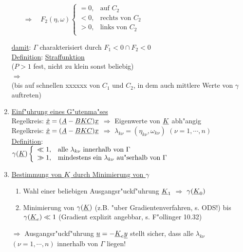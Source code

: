 \documentclass[openany,a4paper,11pt]{book}
\begin{document}
\begin{enumerate}
\begin{itemize}
        $\Rightarrow\quad F_2(\eta,\omega) \left \{%
        \begin{array}{ll}
          =0, & \text{auf } C_2\\
          <0, & \text{rechts von } C_2\\
          >0, & \text{links von } C_2\\
        \end{array} \right.$
    \end{itemize}
    \uline{damit}: $\Gamma$ charakterisiert durch $F_1<0 \cap F_2<0$\\
    \uline{Definition}: \uline{Straffunktion}\\ [3pt]
     \quad ($P>1$ fest, nicht zu klein sonst beliebig)\\
    $\Rightarrow$ \\
    (bis auf schnellen xxxxxx von $C_1$ und $C_2$, in dem auch mittlere Werte von $\gamma$ auftreten)
    \item \uline{Einf"uhrung eines G"utenma"ses}\\
    Regelkreis: $\uline{\dot{x}}=(\uline{A}-\uline{BKC})\uline{x}$ $\Rightarrow$ Eigenwerte von $\uline{K}$ abh"angig\\
    {\color{white}Regelkreis: $\uline{\dot{x}}=(\uline{A}-\uline{BKC})\uline{x}$ $\Rightarrow$} $\lambda_{k\nu}=(\eta_{k\nu},\omega_{k\nu})$ $(\nu=1,\cdots,n)$\\
    \uline{Definition}: \\
    $\gamma(\uline{K}) \left \{%
        \begin{array}{ll}
          \ll 1, & \text{alle } \lambda_{k\nu}\text{ innerhalb von } \Gamma\\
          \gg 1, & \text{mindestens ein } \lambda_{k\nu} \text{ au"serhalb von } \Gamma\\
        \end{array} \right.$
    \item \uline{Bestimmung von $\uline{K}$ durch Minimierung von $\gamma$}\begin{enumerate}
        \item Wahl einer beliebigen Ausgangsr"uckf"uhrung $\uline{K}_1$ $\Rightarrow$ $\gamma(\uline{K}_0)$
        \item Minimierung von $\gamma(\uline{K})$ (z.B. "uber Gradientenverfahren, s. ODS!) bis $\gamma(\uline{K}_e)\ll1$ (Gradient explizit angebbar, s. F"ollinger 10.32)
    \end{enumerate}
    $\Rightarrow$ Ausgangsr"uckf"uhrung $\uline{u}=-\uline{K}_e\uline{y}$ stellt sicher, dass alle $\lambda_{k\nu}$ $(\nu=1,\cdots,n)$ innerhalb von $\Gamma$ liegen!
\end{enumerate}
\end{document}
